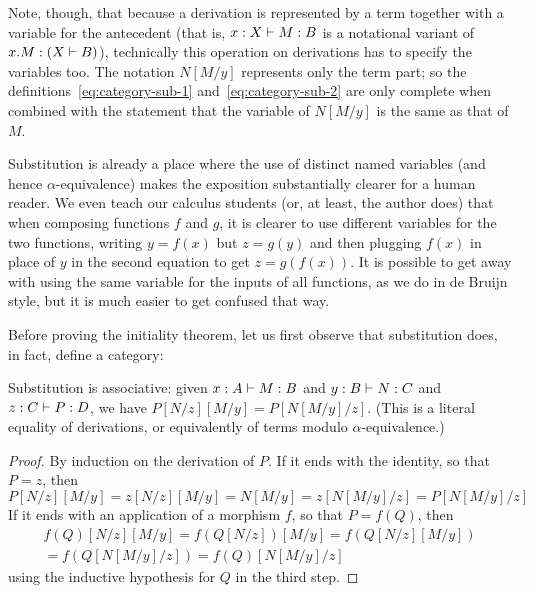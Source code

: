 Note, though, that because a derivation is represented by a term together with a variable for the antecedent (that is, $x:X\vdash M:B$ is a notational variant of $x.M:(X\vdash B)$), technically this operation on derivations has to specify the variables too.
The notation $N[M/y]$ represents only the term part; so the definitions~\eqref{eq:category-sub-1} and~\eqref{eq:category-sub-2} are only complete when combined with the statement that the variable of $N[M/y]$ is the same as that of $M$.

\begin{rmk}
  Substitution is already a place where the use of distinct named variables (and hence $\alpha$-equivalence) makes the exposition substantially clearer for a human reader.
  We even teach our calculus students (or, at least, the author does) that when composing functions $f$ and $g$, it is clearer to use different variables for the two functions, writing $y=f(x)$ but $z=g(y)$ and then plugging $f(x)$ in place of $y$ in the second equation to get $z = g(f(x))$.
  It is possible to get away with using the same variable for the inputs of all functions, as we do in de Bruijn style, but it is much easier to get confused that way.
\end{rmk}

Before proving the initiality theorem, let us first observe that substitution does, in fact, define a category:

\begin{lem}\label{thm:category-subassoc}
  Substitution is associative: given $x:A\vdash M:B$ and $y:B\vdash N:C$ and $z:C\vdash P:D$, we have $P[N/z][M/y] = P[N[M/y]/z]$.
  (This is a literal equality of derivations, or equivalently of terms modulo $\alpha$-equivalence.)
\end{lem}
\begin{proof}
  By induction on the derivation of $P$.
  If it ends with the identity, so that $P=z$, then
  \[P[N/z][M/y] = z[N/z][M/y] = N[M/y] = z[N[M/y]/z] = P[N[M/y]/z] \]
  If it ends with an application of a morphism $f$, so that $P = f(Q)$, then
  \begin{multline*}
    f(Q)[N/z][M/y] = f(Q[N/z])[M/y] = f(Q[N/z][M/y])\\
    = f(Q[N[M/y]/z]) = f(Q)[N[M/y]/z]
  \end{multline*}
  using the inductive hypothesis for $Q$ in the third step.
\end{proof}

